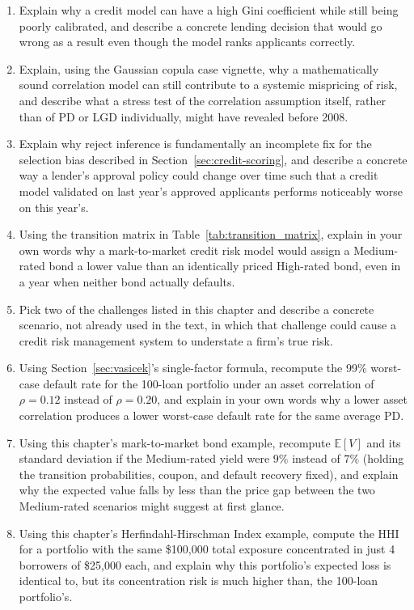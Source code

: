\documentclass[../ai_in_finance]{subfiles}
\begin{document}
\begin{enumerate}[exercises]
    \item Explain why a credit model can have a high Gini coefficient while still being poorly calibrated, and describe a concrete lending decision that would go wrong as a result even though the model ranks applicants correctly.
    \item Explain, using the Gaussian copula case vignette, why a mathematically sound correlation model can still contribute to a systemic mispricing of risk, and describe what a stress test of the correlation assumption itself, rather than of PD or LGD individually, might have revealed before 2008.
    \item Explain why reject inference is fundamentally an incomplete fix for the selection bias described in Section~\ref{sec:credit-scoring}, and describe a concrete way a lender's approval policy could change over time such that a credit model validated on last year's approved applicants performs noticeably worse on this year's.
    \item Using the transition matrix in Table~\ref{tab:transition_matrix}, explain in your own words why a mark-to-market credit risk model would assign a Medium-rated bond a lower value than an identically priced High-rated bond, even in a year when neither bond actually defaults.
    \item Pick two of the challenges listed in this chapter and describe a concrete scenario, not already used in the text, in which that challenge could cause a credit risk management system to understate a firm's true risk.
    \item Using Section~\ref{sec:vasicek}'s single-factor formula, recompute the 99\% worst-case default rate for the 100-loan portfolio under an asset correlation of $\rho=0.12$ instead of $\rho=0.20$, and explain in your own words why a lower asset correlation produces a lower worst-case default rate for the same average PD.
    \item Using this chapter's mark-to-market bond example, recompute $\mathbb{E}[V]$ and its standard deviation if the Medium-rated yield were $9\%$ instead of $7\%$ (holding the transition probabilities, coupon, and default recovery fixed), and explain why the expected value falls by less than the price gap between the two Medium-rated scenarios might suggest at first glance.
    \item Using this chapter's Herfindahl-Hirschman Index example, compute the HHI for a portfolio with the same \$100,000 total exposure concentrated in just 4 borrowers of \$25,000 each, and explain why this portfolio's expected loss is identical to, but its concentration risk is much higher than, the 100-loan portfolio's.

\end{enumerate}
\end{document}
